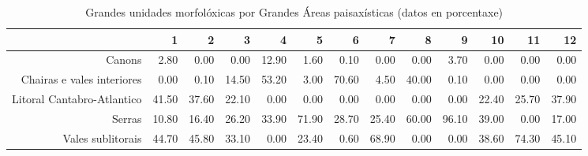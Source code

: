 \begin{table}[p]
\centering
\caption{Grandes unidades morfolóxicas por Grandes Áreas paisaxísticas (datos en porcentaxe)} 
\label{xtaboa1p}
\begin{tabular}{rrrrrrrrrrrrr}
  \hline
 & 1 & 2 & 3 & 4 & 5 & 6 & 7 & 8 & 9 & 10 & 11 & 12 \\ 
  \hline
Canons & 2.80 & 0.00 & 0.00 & 12.90 & 1.60 & 0.10 & 0.00 & 0.00 & 3.70 & 0.00 & 0.00 & 0.00 \\ 
  Chairas e vales interiores & 0.00 & 0.10 & 14.50 & 53.20 & 3.00 & 70.60 & 4.50 & 40.00 & 0.10 & 0.00 & 0.00 & 0.00 \\ 
  Litoral Cantabro-Atlantico & 41.50 & 37.60 & 22.10 & 0.00 & 0.00 & 0.00 & 0.00 & 0.00 & 0.00 & 22.40 & 25.70 & 37.90 \\ 
  Serras & 10.80 & 16.40 & 26.20 & 33.90 & 71.90 & 28.70 & 25.40 & 60.00 & 96.10 & 39.00 & 0.00 & 17.00 \\ 
  Vales sublitorais & 44.70 & 45.80 & 33.10 & 0.00 & 23.40 & 0.60 & 68.90 & 0.00 & 0.00 & 38.60 & 74.30 & 45.10 \\ 
   \hline
\end{tabular}
\end{table}
